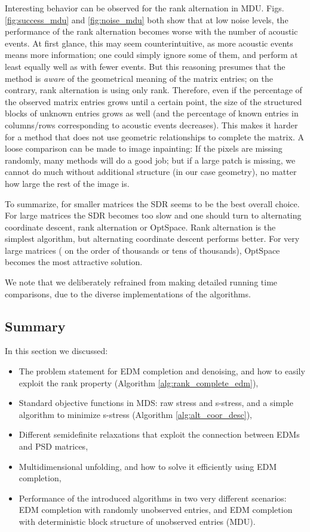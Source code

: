 \documentclass[10pt,double]{IEEEtran}
\begin{document}
{Interesting behavior can be observed for the rank alternation in MDU. Figs.
\ref{fig:success_mdu} and \ref{fig:noise_mdu} both show that at low noise
levels, the performance of the rank alternation becomes worse with the number
of acoustic events. At first glance, this may seem counterintuitive, as more
acoustic events means more information; one could simply ignore some of them,
and perform at least equally well as with fewer events. But this reasoning
presumes that the method is \emph{aware} of the geometrical meaning of the
matrix entries; on the contrary, rank alternation is using only rank.
Therefore, even if the percentage of the observed matrix entries grows until a
certain point, the size of the structured blocks of unknown entries grows as
well (and the percentage of known entries in columns/rows corresponding to
acoustic events decreases). This makes it harder for a method that does not
use geometric relationships to complete the matrix. A loose comparison can be
made to image inpainting: If the pixels are missing randomly, many methods
will do a good job; but if a large patch is missing, we cannot do much without
additional structure (in our case geometry), no matter how large the rest of
the image is.

To summarize, for smaller matrices the SDR seems to be the best overall
choice. For large matrices the SDR becomes too slow and one should turn to
alternating coordinate descent, rank alternation or OptSpace. Rank alternation
is the simplest algorithm, but alternating coordinate descent performs better.
For very large matrices ( on the order of thousands or tens of thousands),
OptSpace becomes the most attractive solution.} We note that we deliberately
refrained from making detailed running time comparisons, due to the diverse
implementations of the algorithms.





\subsection{Summary} 

In this section we discussed:
\begin{itemize}
	\item The problem statement for EDM completion and denoising, and how to
	easily exploit the rank property (Algorithm
	\ref{alg:rank_complete_edm}),
	\item Standard objective functions in MDS: raw stress and s-stress, and
	 a simple algorithm to minimize s-stress (Algorithm
	\ref{alg:alt_coor_desc}),
	\item Different semidefinite relaxations that exploit the connection
	between EDMs and PSD matrices,
	\item Multidimensional unfolding, and how to solve it efficiently using
	EDM completion,
  \item Performance of the introduced algorithms in two very different
  scenarios: EDM completion with randomly unobserved entries, and EDM
  completion with deterministic block structure of unobserved entries (MDU).
\end{itemize}
\end{document}
